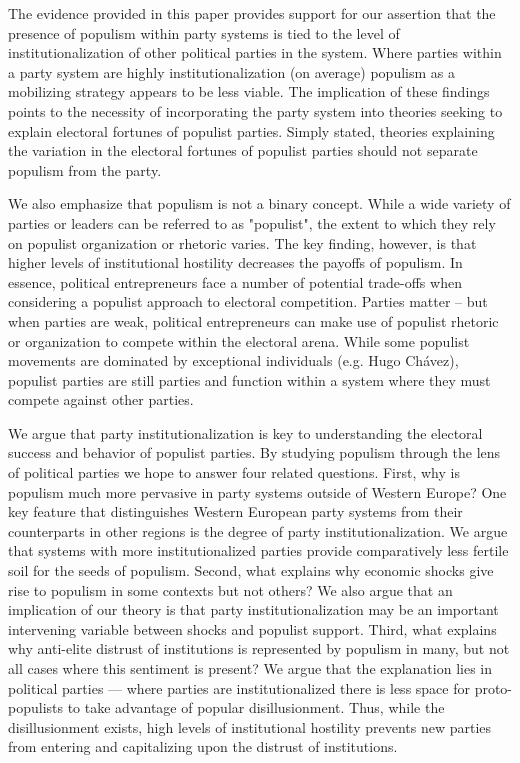 \documentclass[a4paper,12pt]{article}\usepackage[]{graphicx}\usepackage[]{color}
\begin{document}
\par
The evidence provided in this paper provides support for our assertion that the presence of populism within party systems is tied to the level of institutionalization of other political parties in the system. Where parties within a party system are highly institutionalization (on average) populism as a mobilizing strategy appears to be less viable. The implication of these findings points to the necessity of incorporating the party system into theories seeking to explain electoral fortunes of populist parties. Simply stated, theories explaining the variation in the electoral fortunes of populist parties should not separate populism from the party.  
\par
We also emphasize that populism is not a binary concept. While a wide variety of parties or leaders can be referred to as "populist", the extent to which they rely on populist organization or rhetoric varies. The key finding, however, is that higher levels of institutional hostility decreases the payoffs of populism. In essence, political entrepreneurs face a number of potential trade-offs when considering a populist approach to electoral competition. Parties matter -- but when parties are weak, political entrepreneurs can make use of populist rhetoric or organization to compete within the electoral arena. While some populist movements are dominated by exceptional individuals (e.g. Hugo Ch\'{a}vez), populist parties are still parties and function within a system where they must compete against other parties. 
\par
We argue that party institutionalization is key to understanding the electoral success and behavior of populist parties. By studying populism through the lens of political parties we hope to answer four related questions. First, why is populism much more pervasive in party systems outside of Western Europe? One key feature that distinguishes Western European party systems from their counterparts in other regions is the degree of party institutionalization. We argue that systems with more institutionalized parties provide comparatively less fertile soil for the seeds of populism. Second, what explains why economic shocks give rise to populism in some contexts but not others? We also argue that an implication of our theory is that party institutionalization may be an important intervening variable between shocks and populist support. Third, what explains why anti-elite distrust of institutions is represented by populism in many, but not all cases where this sentiment is present? We argue that the explanation lies in political parties — where parties are institutionalized there is less space for proto-populists to take advantage of popular disillusionment. Thus, while the disillusionment exists, high levels of institutional hostility prevents new parties from entering and capitalizing upon the distrust of institutions.
\end{document}
